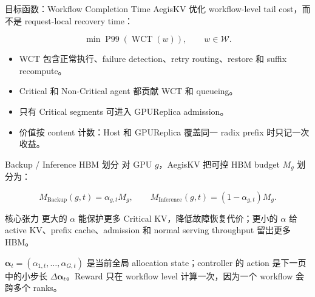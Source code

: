 \documentclass[aspectratio=43]{beamer}
\newcommand{\tightitems}{\setlength{\itemsep}{2pt}\setlength{\parskip}{0pt}}
\newcommand{\AegisKV}{AegisKV}
\newcommand{\Critical}{Critical}
\newcommand{\NonCritical}{Non-Critical}
\newcommand{\GPUReplica}{GPUReplica}
\begin{document}
\begin{frame}{目标函数：Workflow Completion Time}
  \small
  \AegisKV{} 优化 workflow-level tail cost，而不是 request-local recovery time：

  \vspace{0.12cm}
  \[
    \min \operatorname{P99}\left(\operatorname{WCT}(w)\right),
    \qquad w \in \mathcal{W}.
  \]

  \vspace{0.10cm}
  \begin{itemize}
    \tightitems
    \item WCT 包含正常执行、failure detection、retry routing、restore 和 suffix recompute。
    \item \Critical{} 和 \NonCritical{} agent 都贡献 WCT 和 queueing。
    \item 只有 \Critical{} segments 可进入 \GPUReplica{} admission。
    \item 价值按 content 计数：Host 和 GPUReplica 覆盖同一 radix prefix 时只记一次收益。
  \end{itemize}
\end{frame}

\begin{frame}{Backup / Inference HBM 划分}
  \small
  对 GPU $g$，\AegisKV{} 把可控 HBM budget $M_g$ 划分为：

  \vspace{0.10cm}
  \[
    M_{\mathrm{Backup}}(g,t) = \alpha_{g,t} M_g,
    \qquad
    M_{\mathrm{Inference}}(g,t) = (1-\alpha_{g,t})M_g .
  \]

  \vspace{0.10cm}
  \begin{block}{核心张力}
    更大的 $\alpha$ 能保护更多 \Critical{} KV，降低故障恢复代价；更小的 $\alpha$ 给 active KV、prefix cache、admission 和 normal serving throughput 留出更多 HBM。
  \end{block}

  \vspace{0.10cm}
  \footnotesize
  $\boldsymbol{\alpha}_t=(\alpha_{1,t},\ldots,\alpha_{G,t})$ 是当前全局 allocation state；controller 的 action 是下一页中的小步长 $\Delta\boldsymbol{\alpha}_t$。Reward 只在 workflow level 计算一次，因为一个 workflow 会跨多个 ranks。
\end{frame}
\end{document}
